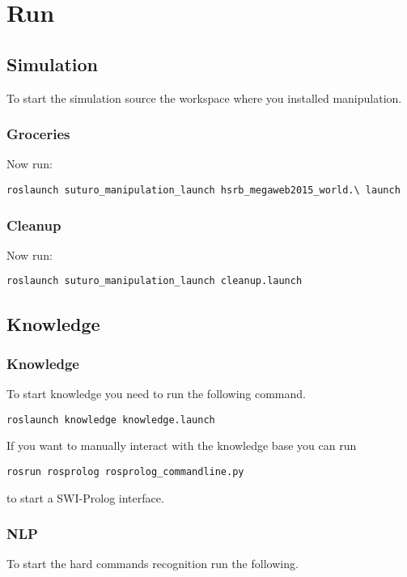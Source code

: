 \documentclass[main.tex]{subfiles}
\begin{document}
	\section{Run}
	\subsection{Simulation}
	To start the simulation source the workspace where you installed manipulation.
	\subsubsection{Groceries}
	Now run:\\
	\begin{lstlisting}
roslaunch suturo_manipulation_launch hsrb_megaweb2015_world.\ launch
\end{lstlisting}

	\subsubsection{Cleanup}
	Now run:\\
	\begin{lstlisting}
roslaunch suturo_manipulation_launch cleanup.launch
\end{lstlisting}

	\subsection{Knowledge}
	\subsubsection{Knowledge}
	To start knowledge you need to run the following command.\\
	\begin{lstlisting}
roslaunch knowledge knowledge.launch
\end{lstlisting}
If you want to manually interact with the knowledge base you can run \\
\begin{lstlisting}
rosrun rosprolog rosprolog_commandline.py
\end{lstlisting}
to start a SWI-Prolog interface.
	
	\subsubsection{NLP}
	
	To start the hard commands recognition run the following.\\
	
\end{document}
